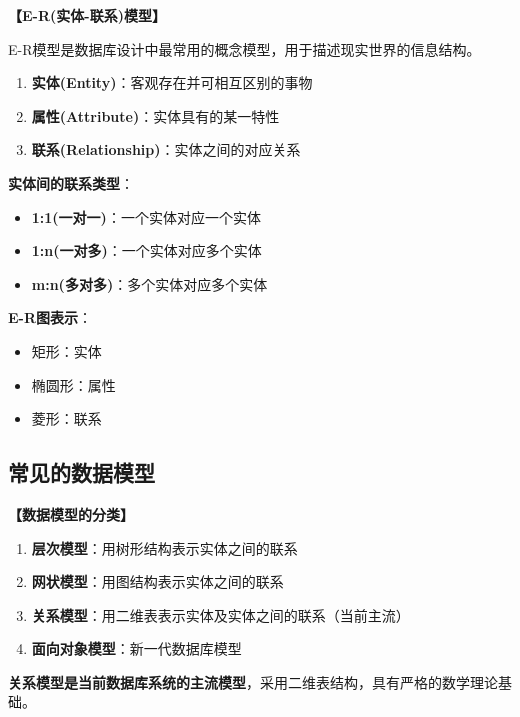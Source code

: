 \documentclass[12pt, a4paper]{article}
\newenvironment{bluebox}[1]{%
  \begin{trivlist}
  \item[\hskip\labelsep \textbf{#1}]
  \setlength{\parskip}{0.5ex}
  \setlength{\itemsep}{0.5ex}
}{%
  \end{trivlist}
}
\begin{document}
\begin{bluebox}{E-R模型}
	\textbf{【E-R(实体-联系)模型】}

	E-R模型是数据库设计中最常用的概念模型，用于描述现实世界的信息结构。

	\begin{enumerate}[leftmargin=*, label=\textbf{\arabic*.}]
		\item \textbf{实体(Entity)}：客观存在并可相互区别的事物
		\item \textbf{属性(Attribute)}：实体具有的某一特性
		\item \textbf{联系(Relationship)}：实体之间的对应关系
	\end{enumerate}

	\textbf{实体间的联系类型}：

	\begin{itemize}
		\item \textbf{1:1(一对一)}：一个实体对应一个实体
		\item \textbf{1:n(一对多)}：一个实体对应多个实体
		\item \textbf{m:n(多对多)}：多个实体对应多个实体
	\end{itemize}

	\textbf{E-R图表示}：

	\begin{itemize}
		\item 矩形：实体
		\item 椭圆形：属性
		\item 菱形：联系
	\end{itemize}
\end{bluebox}

\subsection{常见的数据模型}

\begin{bluebox}{数据模型分类}
	\textbf{【数据模型的分类】}

	\begin{enumerate}[leftmargin=*, label=\textbf{\arabic*.}]
		\item \textbf{层次模型}：用树形结构表示实体之间的联系
		\item \textbf{网状模型}：用图结构表示实体之间的联系
		\item \textbf{关系模型}：用二维表表示实体及实体之间的联系（当前主流）
		\item \textbf{面向对象模型}：新一代数据库模型
	\end{enumerate}

	\textbf{关系模型是当前数据库系统的主流模型}，采用二维表结构，具有严格的数学理论基础。
\end{bluebox}
\end{document}
